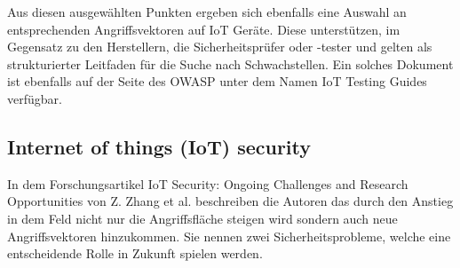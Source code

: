     Aus diesen ausgewählten Punkten ergeben sich ebenfalls eine Auswahl an entsprechenden Angriffsvektoren auf \ac{IoT} Geräte. Diese unterstützen, im Gegensatz zu den Herstellern, die Sicherheitsprüfer oder -tester und gelten als strukturierter Leitfaden für die Suche nach Schwachstellen. Ein solches Dokument ist ebenfalls auf der Seite des \ac{OWASP} unter dem Namen \glqq IoT Testing Guides\grqq{} \cite{smith_2016} verfügbar.
    
    \subsection{Internet of things (IoT) security}
    In dem Forschungsartikel \glqq IoT Security: Ongoing Challenges and Research Opportunities\grqq{} von Z. Zhang et al. \cite{6978614} beschreiben die Autoren das durch den Anstieg in dem Feld nicht nur die Angriffsfläche steigen wird sondern auch neue Angriffsvektoren hinzukommen.
    Sie nennen zwei Sicherheitsprobleme, welche eine entscheidende Rolle in Zukunft spielen werden.
